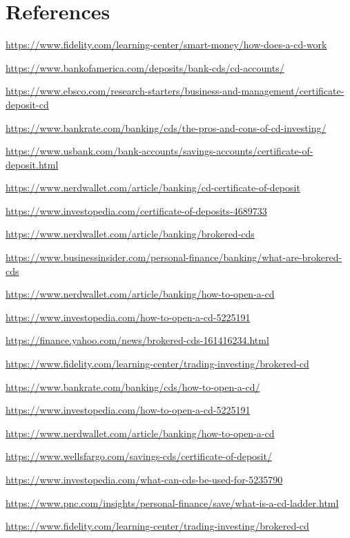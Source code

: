 \documentclass[11pt]{article}
\begin{document}
\section*{References}
\begin{enumerate}[label={[\arabic*]}]
  \item \url{https://www.fidelity.com/learning-center/smart-money/how-does-a-cd-work}
  \item \url{https://www.bankofamerica.com/deposits/bank-cds/cd-accounts/}
  \item \url{https://www.ebsco.com/research-starters/business-and-management/certificate-deposit-cd}
  \item \url{https://www.bankrate.com/banking/cds/the-pros-and-cons-of-cd-investing/}
  \item \url{https://www.usbank.com/bank-accounts/savings-accounts/certificate-of-deposit.html}
  \item \url{https://www.nerdwallet.com/article/banking/cd-certificate-of-deposit}
  \item \url{https://www.investopedia.com/certificate-of-deposits-4689733}
  \item \url{https://www.nerdwallet.com/article/banking/brokered-cds}
  \item \url{https://www.businessinsider.com/personal-finance/banking/what-are-brokered-cds}
  \item \url{https://www.nerdwallet.com/article/banking/how-to-open-a-cd}
  \item \url{https://www.investopedia.com/how-to-open-a-cd-5225191}
  \item \url{https://finance.yahoo.com/news/brokered-cds-161416234.html}
  \item \url{https://www.fidelity.com/learning-center/trading-investing/brokered-cd}
  \item \url{https://www.bankrate.com/banking/cds/how-to-open-a-cd/}
  \item \url{https://www.investopedia.com/how-to-open-a-cd-5225191}
  \item \url{https://www.nerdwallet.com/article/banking/how-to-open-a-cd}
  \item \url{https://www.wellsfargo.com/savings-cds/certificate-of-deposit/}
  \item \url{https://www.investopedia.com/what-can-cds-be-used-for-5235790}
  \item \url{https://www.pnc.com/insights/personal-finance/save/what-is-a-cd-ladder.html}
  \item \url{https://www.fidelity.com/learning-center/trading-investing/brokered-cd}

\end{enumerate}
\end{document}
